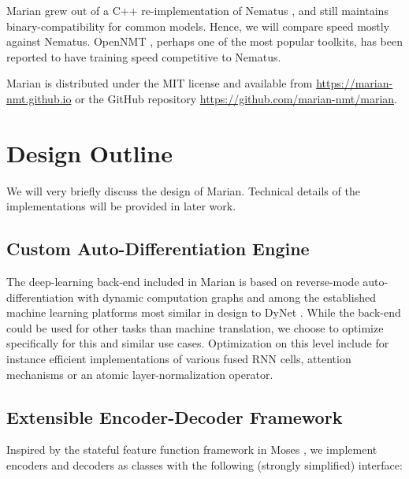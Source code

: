 \documentclass[11pt,a4paper]{article}
\begin{document}

  Marian grew out of a C++ re-implementation of Nematus \cite{sennrich-EtAl:2017:EACLDemo}, and still maintains binary-compatibility for common models. Hence, we will compare speed mostly against Nematus. OpenNMT \cite{klein2017opennmt}, perhaps one of the most popular toolkits, has been reported to have training speed competitive to Nematus. 

  Marian is distributed under the MIT license and available from \url{https://marian-nmt.github.io} or the GitHub repository \url{https://github.com/marian-nmt/marian}.

  \section{Design Outline}

  We will very briefly discuss the design of Marian. Technical details of the implementations will be provided in later work.

  \subsection{Custom Auto-Differentiation Engine}

  The deep-learning back-end included in Marian is based on reverse-mode auto-differentiation with dynamic computation graphs and among the established machine learning platforms most similar in design to DyNet \cite{dynet}. While the back-end could be used for other tasks than machine translation, we choose to optimize specifically for this and similar use cases. Optimization on this level include for instance efficient implementations of various fused RNN cells, attention mechanisms or an atomic layer-normalization \cite{ba2016layer} operator. 

  \subsection{Extensible Encoder-Decoder Framework}
  \label{encdec}

  Inspired by the stateful feature function framework in Moses \cite{conf/acl/KoehnHBCFBCSMZDBCH07}, we implement encoders and decoders as classes with the following (strongly simplified) interface:
\end{document}
